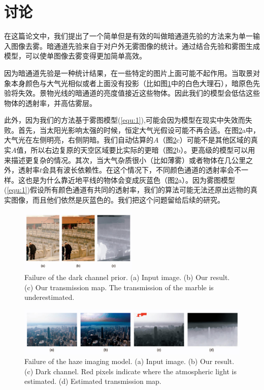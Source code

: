\documentclass{ctexart}
\begin{document}
\section{讨论}
在这篇论文中，我们提出了一个简单但是有效的叫做暗通道先验的方法来为单一输入图像去雾。暗通道先验来自于对户外无雾图像的统计。通过结合先验和雾图生成模型，可以使单图像去雾变得更加简单高效。\par

因为暗通道先验是一种统计结果，在一些特定的图片上面可能不起作用。当取景对象本身颜色与大气光相似或者上面没有投影（比如图\ref{fig:18}中的白色大理石），暗原色先验将失效。景物光线的暗通道的亮度值接近这些物体。因此我们的模型会低估这些物体的透射率，并高估雾层。\par

此外，因为我们的方法基于雾图模型(\ref{equ:1}),可能会因为模型在现实中失效而失败。首先，当太阳光影响太强的时候，恒定大气光假设可能不再合适。在图\ref{fig:19}a中，大气光在左侧明亮，右侧阴暗。我们自动估算的$A$（图\ref{fig:19}c）可能不是其他区域的真实$A$值，所以右边复原的天空区域要比实际的更暗（图\ref{fig:19}b）。更高级的模型\cite{PreethamShirleySmits1999}可以用来描述更复杂的情况。其次，当大气杂质很小（比如薄雾）或者物体在几公里之外\cite{NarasimhanNayar2003_1}，透射率$t$会具有波长依赖性。在这个情况下，不同颜色通道的透射率会不一样。这也是为什么靠近地平线的物体会变成灰蓝色（图\ref{fig:19}a）。因为雾图模型(\ref{equ:1})假设所有颜色通道有共同的透射率，我们的算法可能无法还原出远物的真实图像，而且他们依然是灰蓝色的。我们把这个问题留给后续的研究。

\begin{figure}[tbp]
	\centering
	\includegraphics[width=0.5\textwidth]{img/18.jpg}
	\caption{Failure of the dark channel prior. (a) Input image. (b) Our result. (c) Our transmission map. The transmission of the marble is underestimated.}\label{fig:18}
\end{figure}

\begin{figure}[tbp]
	\centering
	\includegraphics[width=\textwidth]{img/19.jpg}
	\caption{Failure of the haze imaging model. (a) Input image. (b) Our result. (c) Dark channel. Red pixels indicate where the atmospheric light is estimated. (d) Estimated transmission map.}\label{fig:19}
\end{figure}




\end{document}
